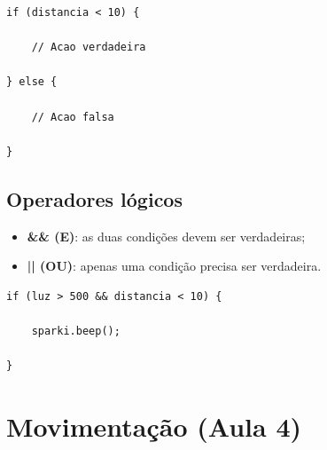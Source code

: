 \documentclass[conference]{IEEEtran}
\begin{document}
\vspace{0.2cm}

\begin{lstlisting}[caption={Estrutura condicional}]
if (distancia < 10) {

    // Acao verdadeira

} else {

    // Acao falsa

}
\end{lstlisting}

\subsection{Operadores lógicos}

\begin{itemize}
    \item \textbf{\&\& (E)}: as duas condições devem ser verdadeiras;
    \item \textbf{|| (OU)}: apenas uma condição precisa ser verdadeira.
\end{itemize}

\vspace{0.2cm}

\begin{lstlisting}[caption={Exemplo com operadores logicos}]
if (luz > 500 && distancia < 10) {

    sparki.beep();

}
\end{lstlisting}

\vspace{0.5cm}

\section{Movimentação (Aula 4)}
\end{document}
